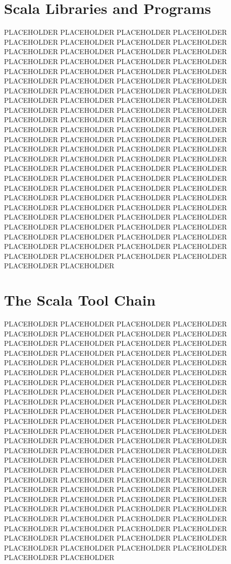 \section{Scala Libraries and Programs}

PLACEHOLDER PLACEHOLDER PLACEHOLDER PLACEHOLDER PLACEHOLDER PLACEHOLDER PLACEHOLDER PLACEHOLDER PLACEHOLDER PLACEHOLDER PLACEHOLDER PLACEHOLDER PLACEHOLDER PLACEHOLDER PLACEHOLDER PLACEHOLDER PLACEHOLDER PLACEHOLDER PLACEHOLDER PLACEHOLDER PLACEHOLDER PLACEHOLDER PLACEHOLDER PLACEHOLDER PLACEHOLDER PLACEHOLDER PLACEHOLDER PLACEHOLDER PLACEHOLDER PLACEHOLDER PLACEHOLDER PLACEHOLDER PLACEHOLDER PLACEHOLDER PLACEHOLDER PLACEHOLDER PLACEHOLDER PLACEHOLDER PLACEHOLDER PLACEHOLDER PLACEHOLDER PLACEHOLDER PLACEHOLDER PLACEHOLDER PLACEHOLDER PLACEHOLDER PLACEHOLDER PLACEHOLDER PLACEHOLDER PLACEHOLDER PLACEHOLDER PLACEHOLDER PLACEHOLDER PLACEHOLDER PLACEHOLDER PLACEHOLDER PLACEHOLDER PLACEHOLDER PLACEHOLDER PLACEHOLDER PLACEHOLDER PLACEHOLDER PLACEHOLDER PLACEHOLDER PLACEHOLDER PLACEHOLDER PLACEHOLDER PLACEHOLDER PLACEHOLDER PLACEHOLDER PLACEHOLDER PLACEHOLDER PLACEHOLDER PLACEHOLDER PLACEHOLDER PLACEHOLDER PLACEHOLDER PLACEHOLDER PLACEHOLDER PLACEHOLDER PLACEHOLDER PLACEHOLDER PLACEHOLDER PLACEHOLDER PLACEHOLDER PLACEHOLDER PLACEHOLDER PLACEHOLDER PLACEHOLDER PLACEHOLDER PLACEHOLDER PLACEHOLDER PLACEHOLDER PLACEHOLDER PLACEHOLDER PLACEHOLDER PLACEHOLDER PLACEHOLDER

\section{The Scala Tool Chain}

PLACEHOLDER PLACEHOLDER PLACEHOLDER PLACEHOLDER PLACEHOLDER PLACEHOLDER PLACEHOLDER PLACEHOLDER PLACEHOLDER PLACEHOLDER PLACEHOLDER PLACEHOLDER PLACEHOLDER PLACEHOLDER PLACEHOLDER PLACEHOLDER PLACEHOLDER PLACEHOLDER PLACEHOLDER PLACEHOLDER PLACEHOLDER PLACEHOLDER PLACEHOLDER PLACEHOLDER PLACEHOLDER PLACEHOLDER PLACEHOLDER PLACEHOLDER PLACEHOLDER PLACEHOLDER PLACEHOLDER PLACEHOLDER PLACEHOLDER PLACEHOLDER PLACEHOLDER PLACEHOLDER PLACEHOLDER PLACEHOLDER PLACEHOLDER PLACEHOLDER PLACEHOLDER PLACEHOLDER PLACEHOLDER PLACEHOLDER PLACEHOLDER PLACEHOLDER PLACEHOLDER PLACEHOLDER PLACEHOLDER PLACEHOLDER PLACEHOLDER PLACEHOLDER PLACEHOLDER PLACEHOLDER PLACEHOLDER PLACEHOLDER PLACEHOLDER PLACEHOLDER PLACEHOLDER PLACEHOLDER PLACEHOLDER PLACEHOLDER PLACEHOLDER PLACEHOLDER PLACEHOLDER PLACEHOLDER PLACEHOLDER PLACEHOLDER PLACEHOLDER PLACEHOLDER PLACEHOLDER PLACEHOLDER PLACEHOLDER PLACEHOLDER PLACEHOLDER PLACEHOLDER PLACEHOLDER PLACEHOLDER PLACEHOLDER PLACEHOLDER PLACEHOLDER PLACEHOLDER PLACEHOLDER PLACEHOLDER PLACEHOLDER PLACEHOLDER PLACEHOLDER PLACEHOLDER PLACEHOLDER PLACEHOLDER PLACEHOLDER PLACEHOLDER PLACEHOLDER PLACEHOLDER PLACEHOLDER PLACEHOLDER PLACEHOLDER PLACEHOLDER

